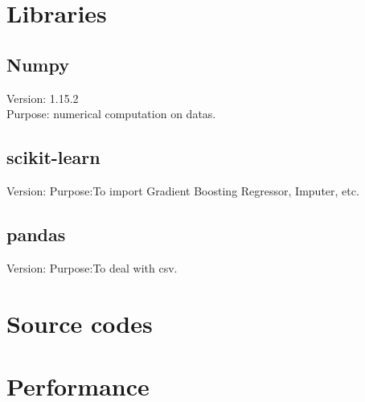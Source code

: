 \documentclass{article}
\begin{document}
\section{Libraries}
\subsection{Numpy}
\noindent
Version: 1.15.2 \\
Purpose: numerical computation on datas.

\subsection{scikit-learn}
\noindent
Version:
Purpose:To import Gradient Boosting Regressor, Imputer, etc.

\subsection{pandas}
\noindent
Version:
Purpose:To deal with csv.

\section{Source codes}

\section{Performance}
\end{document}
